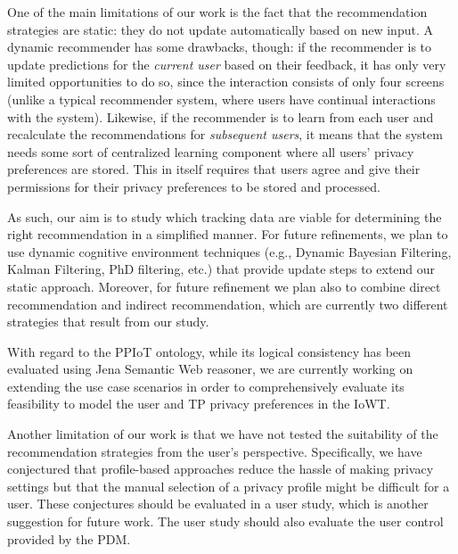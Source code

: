 One of the main limitations of our work is the fact that the recommendation strategies are static: they do not update automatically based on new input. A dynamic recommender has some drawbacks, though: if the recommender is to update predictions for the \textit{current user} based on their feedback, it has only very limited opportunities to do so, since the interaction consists of only four screens (unlike a typical recommender system, where users have continual interactions with the system). Likewise, if the recommender is to learn from each user and recalculate the recommendations for \textit{subsequent users}, it means that the system needs some sort of centralized learning component where all users' privacy preferences are stored. This in itself 
requires that users agree and give  their  permissions for their privacy preferences to be stored and processed. 

As such, our aim is to study which tracking data are viable for determining the right recommendation in a simplified manner. For future refinements, we plan to use dynamic cognitive environment techniques (e.g., Dynamic Bayesian Filtering, Kalman Filtering, PhD filtering, etc.) that provide update steps to extend our static approach.
Moreover, for future refinement we plan also to combine direct recommendation and indirect recommendation, which are currently two different strategies that result from our study.

With regard to the PPIoT ontology, while its logical consistency has been evaluated  using  Jena Semantic Web reasoner, we are currently working on extending the use case scenarios in order to comprehensively evaluate its  feasibility to model the user and TP privacy preferences in the IoWT.


Another limitation of our work is that we have not tested the suitability of the recommendation strategies from the user's perspective. Specifically, we have conjectured that profile-based approaches reduce the hassle of making privacy settings but that the manual selection of a privacy profile might be difficult for a user. These conjectures should be evaluated in a user study, which is another suggestion for future work. The user study should also evaluate the user control provided by the PDM.  

